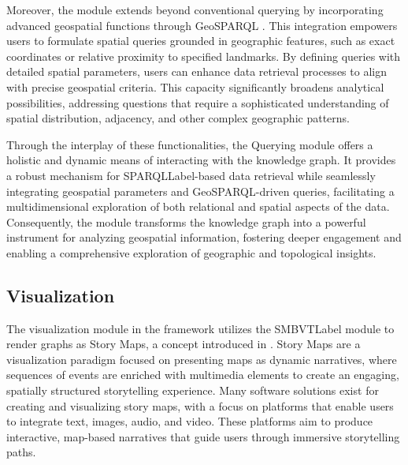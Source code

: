 Moreover, the module extends beyond conventional querying by incorporating advanced geospatial functions through GeoSPARQL \cite{matthewperryOGCGeoSPARQLGeographic2012}. This integration empowers users to formulate spatial queries grounded in geographic features, such as exact coordinates or relative proximity to specified landmarks. By defining queries with detailed spatial parameters, users can enhance data retrieval processes to align with precise geospatial criteria. This capacity significantly broadens analytical possibilities, addressing questions that require a sophisticated understanding of spatial distribution, adjacency, and other complex geographic patterns.

Through the interplay of these functionalities, the Querying module offers a holistic and dynamic means of interacting with the knowledge graph. It provides a robust mechanism for \acrshort{SPARQLLabel}-based data retrieval while seamlessly integrating geospatial parameters and GeoSPARQL-driven queries, facilitating a multidimensional exploration of both relational and spatial aspects of the data. Consequently, the module transforms the knowledge graph into a powerful instrument for analyzing geospatial information, fostering deeper engagement and enabling a comprehensive exploration of geographic and topological insights.


\subsection{Visualization}\label{VI-subsec:visualization}

The visualization module in the framework utilizes the \acrfull{SMBVTLabel} module to render graphs as Story Maps, a concept introduced in \cite{bartalesiWebToolCreate2023c, bartalesiUnstructuredTextsSemantic2023b}. Story Maps are a visualization paradigm focused on presenting maps as dynamic narratives, where sequences of events are enriched with multimedia elements to create an engaging, spatially structured storytelling experience. Many software solutions exist for creating and visualizing story maps, with a focus on platforms that enable users to integrate text, images, audio, and video. These platforms aim to produce interactive, map-based narratives that guide users through immersive storytelling paths.

